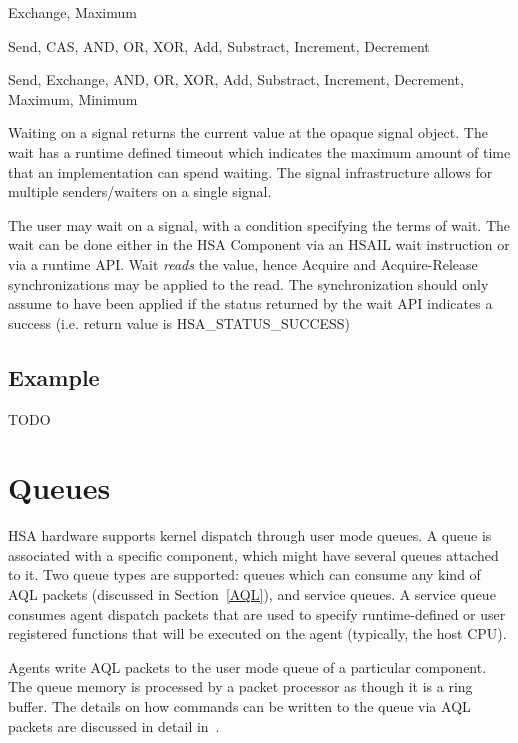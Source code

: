\documentclass[final]{book}
\newcommand{\reftyp}[1]{#1}
\newcommand{\refenu}[1]{\reftyp{#1}}
\begin{document}
\begin{description}[font=\it, leftmargin=1.5em]
\item[Acquire-Release synchronization] Exchange, Maximum
\item[Release synchronization] Send, CAS, AND, OR, XOR, Add, Substract, Increment, Decrement
\item[Relaxed synchronization] Send, Exchange, AND, OR, XOR, Add, Substract, Increment, Decrement, Maximum, Minimum
\end{description}

Waiting on a signal returns the current value at the opaque signal object. The
wait has a runtime defined timeout which indicates the maximum amount of time
that an implementation can spend waiting. The signal infrastructure allows for
multiple senders/waiters on a single signal.

The user may wait on a signal, with a condition specifying the terms of
wait. The wait can be done either in the HSA Component via an HSAIL wait
instruction or via a runtime API. Wait \emph{reads} the value, hence Acquire and
Acquire-Release synchronizations may be applied to the read. The synchronization
should only assume to have been applied if the status returned by the wait API
indicates a success (i.e. return value is \refenu{HSA_STATUS_SUCCESS})

\hypertarget{signal-example}{} \subsection{Example}
TODO

\hypertarget{architected-queue}{} \section{Queues} \label{architected-queue}
HSA hardware supports kernel dispatch through user mode queues. A queue is
associated with a specific component, which might have several queues attached
to it. Two queue types are supported: queues which can consume any kind of AQL
packets (discussed in Section~\ref{AQL}), and service queues. A service queue
consumes agent dispatch packets that are used to specify runtime-defined or user
registered functions that will be executed on the agent (typically, the host
CPU).

Agents write AQL packets to the user mode queue of a particular component. The
queue memory is processed by a packet processor as though it is a ring
buffer. The details on how commands can be written to the queue via AQL packets
are discussed in detail in~\cite{sar}.
\end{document}
